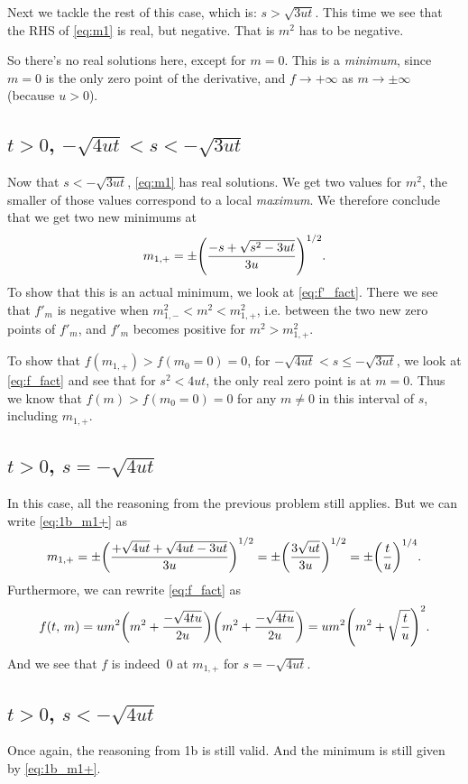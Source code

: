 \documentclass[11pt,letter, swedish, english
]{article}
\begin{document}
Next we tackle the rest of this case, which is: $s>\sqrt{3ut}$. This
time we see that the RHS of \eqref{eq:m1} is real, but negative. That
is $m^2$ has to be negative. 

So there's no real solutions here, except for $m=0$. This is a
\emph{minimum}, since $m=0$ is the only zero point of the derivative, and
$f\to+\infty$ as $m\to\pm\infty$ (because $u>0$).

\subsection{$t>0$, $-\sqrt{4ut}<s<-\sqrt{3ut}$}
Now that $s<-\sqrt{3ut}$, \eqref{eq:m1} has real solutions. We get
two values for $m^2$, the smaller of those values correspond to a
local \emph{maximum}. We therefore conclude that we get two new
minimums at
\begin{equation}\label{eq:1b_m1+}
m_{1,+}=\pm\qty(\frac{-s+\sqrt{s^2-3ut}}{3u})^{1/2}.
\end{equation}
To show that this is an actual minimum, we look at
\eqref{eq:f'_fact}. There we see that $f'_m$ is negative when
$m_{1,-}^2<m^2<m_{1,+}^2$, i.e. between the two new zero points of
$f'_m$, and $f'_m$ becomes positive for $m^2>m_{1,+}^2$.


To show that $f(m_{1,+})>f(m_0=0)=0$, for $-\sqrt{4ut}<s\le-\sqrt{3ut}$,
we look at \eqref{eq:f_fact} and see that for $s^2<4ut$, the only real
zero point is at $m=0$. Thus we know that $f(m)>f(m_0=0)=0$ for any
$m\neq0$ in this interval of $s$, including $m_{1,+}$.
  
\subsection{$t>0$, $s=-\sqrt{4ut}$}
In this case, all the reasoning from the previous problem still
applies. But we can write \eqref{eq:1b_m1+} as
\begin{equation}
m_{1,+}=\pm\qty(\frac{+\sqrt{4ut}+\sqrt{4ut-3ut}}{3u})^{1/2}
=\pm\qty(\frac{3\sqrt{ut}}{3u})^{1/2}
=\pm\qty(\frac{t}{u})^{1/4}.
\end{equation}
Furthermore, we can rewrite \eqref{eq:f_fact} as
\begin{equation}
f(t,\,m)=um^2
\qty(m^2+\frac{-\sqrt{4tu}}{2u})
\qty(m^2+\frac{-\sqrt{4tu}}{2u})
=um^2\qty(m^2+\sqrt{\frac{t}{u}})^2.
\end{equation}
And we see that $f$ is indeed~0 at $m_{1,+}$ for $s=-\sqrt{4ut}$.


\subsection{$t>0$, $s<-\sqrt{4ut}$}
Once again, the reasoning from 1b is still valid. And the minimum is
still given by \eqref{eq:1b_m1+}. 
\end{document}
